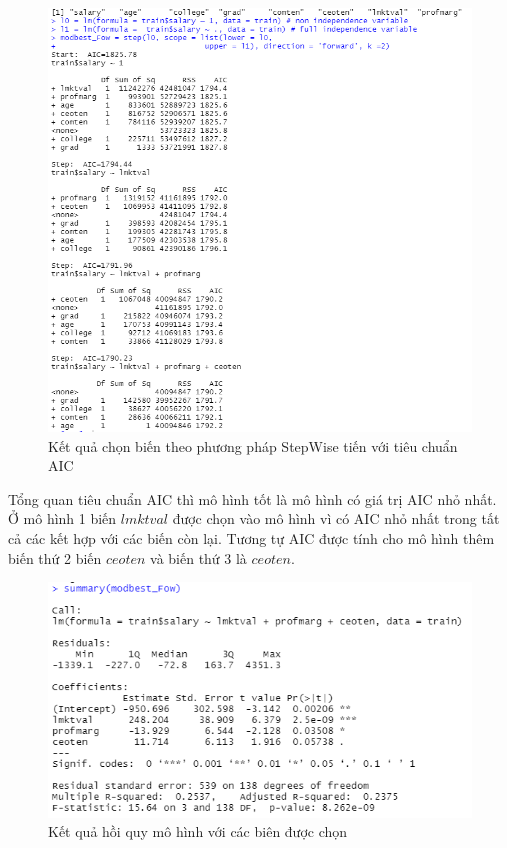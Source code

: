 \begin{figure}[H]
	\centering
	\includegraphics[scale = 0.52]{../Photo Of Result/B1_stepwiseForward.PNG}  
	\caption{Kết quả chọn biến theo phương pháp StepWise tiến với tiêu chuẩn AIC}
	\label{fig-b1:stepwise-forward}
\end{figure}

Tổng quan tiêu chuẩn AIC thì mô hình tốt là mô hình có giá trị AIC nhỏ nhất. Ở mô hình 1 biến $\textit{lmktval}$ được chọn vào mô hình vì có AIC nhỏ nhất trong tất cả các kết hợp với các biến còn lại. Tương tự AIC được tính cho mô hình thêm biến thứ 2 biến $\textit{ceoten}$ và biến thứ 3 là $\textit{ceoten}$. 

\begin{figure}[H]
	\centering
	\includegraphics[scale = 0.52]{../Photo Of Result/B1_summary.PNG}  
	\caption{Kết quả hồi quy mô hình với các biên được chọn}
	\label{ex1:model:1}
\end{figure}


